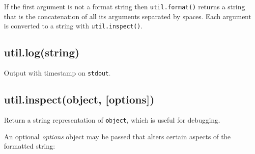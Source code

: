 \begin{Shaded}
\end{Shaded}

If the first argument is not a format string then \texttt{util.format()}
returns a string that is the concatenation of all its arguments
separated by spaces. Each argument is converted to a string with
\texttt{util.inspect()}.

\begin{Shaded}
\begin{Highlighting}[]
\NormalTok{(}\NormalTok{, }\NormalTok{, }\NormalTok{); }
\end{Highlighting}
\end{Shaded}

\subsection{util.log(string)}

Output with timestamp on \texttt{stdout}.

\begin{Shaded}
\begin{Highlighting}[]
\NormalTok{(}\NormalTok{);}
\end{Highlighting}
\end{Shaded}

\subsection{util.inspect(object, {[}options{]})}

Return a string representation of \texttt{object}, which is useful for
debugging.

An optional \emph{options} object may be passed that alters certain
aspects of the formatted string:


